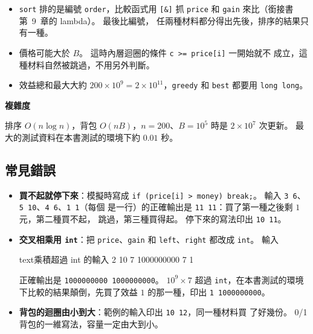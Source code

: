 
\begin{itemize}
\item \texttt{sort} 排的是編號 \texttt{order}，比較函式用 \texttt{[\&]} 抓
\texttt{price} 和 \texttt{gain} 來比（銜接書第~9~章的 lambda）。 最後比編號，
任兩種材料都分得出先後，排序的結果只有一種。
\item 價格可能大於 $B$。 這時內層迴圈的條件 \texttt{c >= price[i]} 一開始就不
成立，這種材料自然被跳過，不用另外判斷。
\item 效益總和最大大約 $200 \times 10^9 = 2 \times 10^{11}$，\texttt{greedy}
和 \texttt{best} 都要用 \texttt{long long}。
\end{itemize}

\textbf{複雜度}

排序 $O(n \log n)$，背包 $O(nB)$，$n = 200$、$B = 10^5$ 時是 $2 \times 10^7$
次更新。 最大的測試資料在本書測試的環境下約 $0.01$ 秒。

\subsection{常見錯誤}

\begin{itemize}
\item \textbf{買不起就停下來}：模擬時寫成 \texttt{if (price[i] > money)
break;}。 輸入 \texttt{3 6}、\texttt{5 10}、\texttt{4 6}、\texttt{1 1}（每個
是一行）的正確輸出是 \texttt{11 11}：買了第一種之後剩 $1$ 元，第二種買不起，
跳過，第三種買得起。 停下來的寫法印出 \texttt{10 11}。
\item \textbf{交叉相乘用 \texttt{int}}：把 \texttt{price}、\texttt{gain} 和
\texttt{left}、\texttt{right} 都改成 \texttt{int}。 輸入
\begin{code}{text}{乘積超過 int 的輸入}
2 10
7 1000000000
7 1
\end{code}
正確輸出是 \texttt{1000000000 1000000000}。 $10^9 \times 7$ 超過
\texttt{int}，在本書測試的環境下比較的結果顛倒，先買了效益 $1$ 的那一種，印出
\texttt{1 1000000000}。
\item \textbf{背包的迴圈由小到大}：範例的輸入印出 \texttt{10 12}，同一種材料買
了好幾份。 0/1 背包的一維寫法，容量一定由大到小。
\end{itemize}

